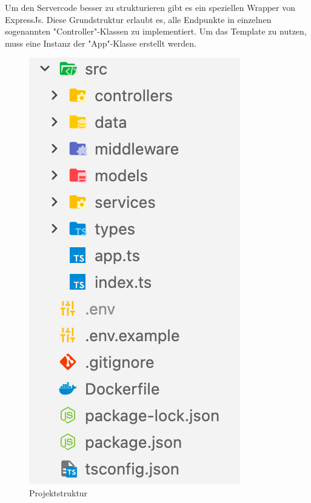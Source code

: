 
Um den Servercode besser zu strukturieren gibt es ein speziellen Wrapper von ExpressJs. Diese Grundstruktur erlaubt es, alle Endpunkte in einzelnen sogenannten "Controller"-Klassen zu implementiert. Um das Template zu nutzen, muss eine Instanz der "App"-Klasse erstellt werden.

\begin{figure}[H]
    \centering
    \includegraphics{media/APITemplate/ProjectStructure.png}
    \caption{Projektstruktur}
\end{figure}

\pagebreak







